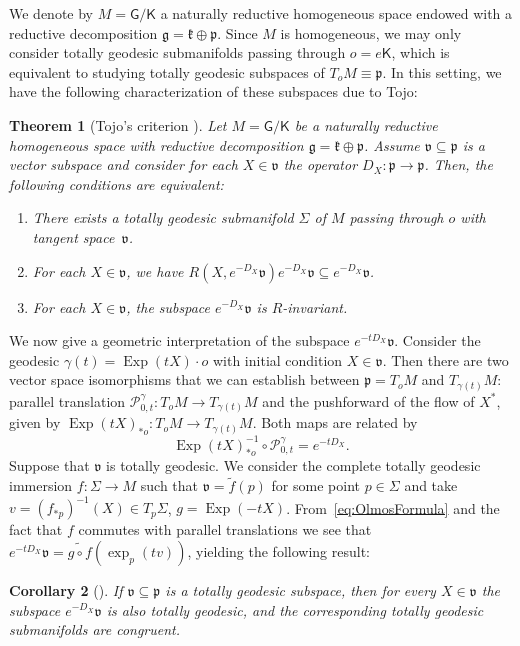 \documentclass[11pt,a4paper,final]{amsart}
\newcommand{\s}{\mathsf}
\newcommand{\g}{\mathfrak}
\newcommand{\Exp}{\operatorname{Exp}}
\renewcommand{\tilde}{\widetilde}
\newtheorem{theorem}{Theorem}[section]
\newtheorem{corollary}[theorem]{Corollary}
\theoremstyle{definition}
\begin{document}
We denote by $M=\mathsf{G}/\mathsf{K}$ a naturally reductive homogeneous space endowed with a reductive decomposition $\g{g}=\g{k}\oplus \g{p}$.
Since $M$ is homogeneous, we may only consider totally geodesic submanifolds passing through $o=e\s{K}$, which is equivalent to studying totally geodesic subspaces of $T_{o}M\equiv \g{p}$.
In this setting, we have the following characterization of these subspaces due to Tojo:

\begin{theorem}[Tojo's criterion \cite{TojoTotallyGeodesic}]\label{thm:TojoCriterion}
	Let $M=\mathsf{G}/\mathsf{K}$ be a naturally reductive homogeneous space with reductive decomposition $\g{g}=\g{k}\oplus\g{p}$.
	Assume $\g{v}\subseteq \g{p}$ is a vector subspace and consider for each $X\in \g{v}$ the operator $D_{X}\colon \g{p}\to \g{p}$.
	Then, the following conditions are equivalent:
	\begin{enumerate}[\rm (i)]
		\item\label{thItem:TojoExistence} There exists a totally geodesic submanifold $\Sigma$ of $M$ passing through $o$ with tangent space~$\g{v}$.
		\item\label{thItem:TojoHalfInvariance} For each $X\in \g{v}$, we have $R(X,e^{-D_{X}}\g{v})e^{-D_{X}}\g{v}\subseteq e^{-D_{X}}\g{v}$.
		\item\label{thItem:TojoFullInvariance} For each $X\in \g{v}$, the subspace $e^{-D_{X}}\g{v}$ is $R$-invariant.
	\end{enumerate}
\end{theorem}

We now give a geometric interpretation of the subspace $e^{-t D_{X}}\g{v}$.
Consider the geodesic $\gamma(t)=\Exp(t X)\cdot o$ with initial condition $X\in \g{v}$.
Then there are two vector space isomorphisms that we can establish between $\g{p}=T_{o}M$ and $T_{\gamma(t)}M$: parallel translation $\mathcal{P}_{0,t}^{\gamma}\colon T_{o}M\to T_{\gamma(t)}M$ and the pushforward of the flow of $X^{*}$, given by $\Exp(tX)_{*o}\colon T_{o}M\to T_{\gamma(t)}M$.
Both maps are related by \cite[Equation~(2.2.1)]{DO-nullity}
\begin{equation}\label{eq:OlmosFormula}
	\Exp(tX)^{-1}_{*o}\circ \mathcal{P}_{0,t}^{\gamma}=e^{-t D_{X}}.
\end{equation}
Suppose that $\g{v}$ is totally geodesic. We consider the complete totally geodesic immersion $f\colon \Sigma\to M$ such that $\g{v}=\tilde{f}(p)$ for some point $p\in \Sigma$ and take $v=(f_{*p})^{-1}(X)\in T_{p}\Sigma$, $g=\Exp(-t X)$.
From~\eqref{eq:OlmosFormula} and the fact that $f$ commutes with parallel translations we see that $e^{-tD_X}\g{v}=\tilde{g\circ f}(\exp_{p}(tv))$, yielding the following result:
\begin{corollary}[{\cite[Proposition 3.5]{TojoTotallyGeodesic}}]\label{cor:TojoCongruentSubmanifolds}
	If $\g{v}\subseteq \g{p}$ is a totally geodesic subspace, then for every $X\in \g{v}$ the subspace $e^{-D_X}\g{v}$ is also totally geodesic, and the corresponding totally geodesic submanifolds are congruent.
\end{corollary}
\end{document}
